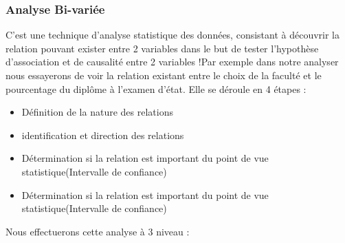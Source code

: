 \subsubsection{Analyse Bi-variée}
C'est une technique d'analyse statistique des données, consistant à
découvrir la relation pouvant exister entre 2 variables dans le but de
tester l'hypothèse d'association et de causalité entre 2 variables !Par
exemple dans notre analyser nous essayerons de voir la relation
existant entre le choix de la faculté et le pourcentage du diplôme à l'examen d'état. Elle se déroule en 4 étapes : \cite{becker2011uncertainty}
\begin{itemize}
	\item Définition de la nature des relations
	\item  identification et direction des relations 
	\item   Détermination si
	la relation est important du point de vue statistique(Intervalle de
	confiance)
	\item  Détermination si
	la relation est important du point de vue statistique(Intervalle de
	confiance)
\end{itemize}
Nous effectuerons cette analyse à 3 niveau :

